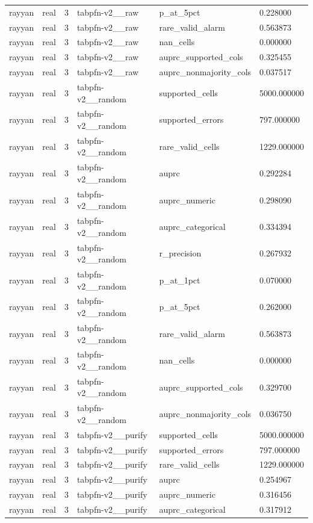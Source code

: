 \begin{tabular}{llllll}
rayyan & real & 3 & tabpfn-v2\_\_raw & p\_at\_5pct & 0.228000 \\
rayyan & real & 3 & tabpfn-v2\_\_raw & rare\_valid\_alarm & 0.563873 \\
rayyan & real & 3 & tabpfn-v2\_\_raw & nan\_cells & 0.000000 \\
rayyan & real & 3 & tabpfn-v2\_\_raw & auprc\_supported\_cols & 0.325455 \\
rayyan & real & 3 & tabpfn-v2\_\_raw & auprc\_nonmajority\_cols & 0.037517 \\
rayyan & real & 3 & tabpfn-v2\_\_random & supported\_cells & 5000.000000 \\
rayyan & real & 3 & tabpfn-v2\_\_random & supported\_errors & 797.000000 \\
rayyan & real & 3 & tabpfn-v2\_\_random & rare\_valid\_cells & 1229.000000 \\
rayyan & real & 3 & tabpfn-v2\_\_random & auprc & 0.292284 \\
rayyan & real & 3 & tabpfn-v2\_\_random & auprc\_numeric & 0.298090 \\
rayyan & real & 3 & tabpfn-v2\_\_random & auprc\_categorical & 0.334394 \\
rayyan & real & 3 & tabpfn-v2\_\_random & r\_precision & 0.267932 \\
rayyan & real & 3 & tabpfn-v2\_\_random & p\_at\_1pct & 0.070000 \\
rayyan & real & 3 & tabpfn-v2\_\_random & p\_at\_5pct & 0.262000 \\
rayyan & real & 3 & tabpfn-v2\_\_random & rare\_valid\_alarm & 0.563873 \\
rayyan & real & 3 & tabpfn-v2\_\_random & nan\_cells & 0.000000 \\
rayyan & real & 3 & tabpfn-v2\_\_random & auprc\_supported\_cols & 0.329700 \\
rayyan & real & 3 & tabpfn-v2\_\_random & auprc\_nonmajority\_cols & 0.036750 \\
rayyan & real & 3 & tabpfn-v2\_\_purify & supported\_cells & 5000.000000 \\
rayyan & real & 3 & tabpfn-v2\_\_purify & supported\_errors & 797.000000 \\
rayyan & real & 3 & tabpfn-v2\_\_purify & rare\_valid\_cells & 1229.000000 \\
rayyan & real & 3 & tabpfn-v2\_\_purify & auprc & 0.254967 \\
rayyan & real & 3 & tabpfn-v2\_\_purify & auprc\_numeric & 0.316456 \\
rayyan & real & 3 & tabpfn-v2\_\_purify & auprc\_categorical & 0.317912 \\

\end{tabular}
